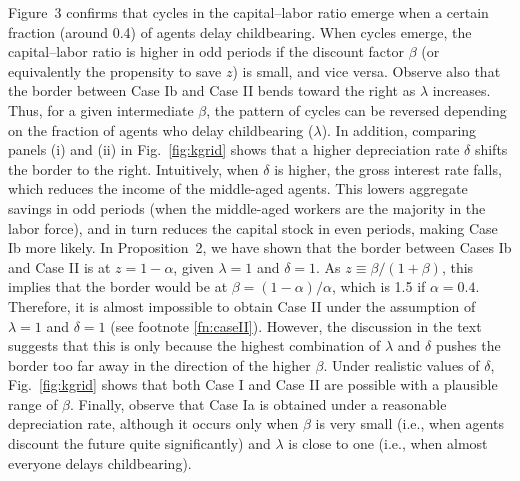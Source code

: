 \documentclass[nogrid]{MBE}%
\begin{document}
{Figure~3 confirms that cycles in the capital--labor ratio emerge when a certain fraction (around
0.4) of agents delay childbearing. When cycles emerge, the capital--labor ratio is higher in odd
periods if the discount factor $\beta$ (or equivalently the propensity to save $z$) is small, and
vice versa. Observe also that the border between Case Ib and Case II bends toward the right as
$\lambda$ increases. Thus, for a given intermediate $\beta$, the pattern of cycles can be reversed
depending on the fraction of agents who delay childbearing ($\lambda$). In addition, comparing
panels (i) and (ii) in Fig.\ \ref{fig:kgrid} shows that a higher depreciation rate $\delta$ shifts
the border to the right. Intuitively, when $\delta$ is higher, the gross interest rate falls,
which reduces the income of the middle-aged agents. This lowers aggregate savings in odd periods
(when the middle-aged workers are the majority in the labor force), and in turn reduces the
capital stock in even periods, making Case Ib more likely. {\label{fn:border} In Proposition~2, we
have shown that the border between Cases Ib and Case II is at $z=1-\alpha$, given $\lambda=1$ and
$\delta=1$. As $z\equiv \beta/(1+\beta)$, this implies that the border would be at $\beta
=(1-\alpha)/\alpha$, which is 1.5 if $\alpha=0.4$. Therefore, it is almost impossible to obtain
Case II under the assumption of $\lambda=1$ and $\delta=1$ (see footnote \ref{fn:caseII}).
However, the discussion in the text suggests that this is only because the highest combination of
$\lambda$ and $\delta$ pushes the border too far away in the direction of the higher $\beta $.
Under realistic values of $\delta$, Fig.\ \ref{fig:kgrid} shows that both Case I and Case II are
possible with a plausible range of $\beta$.} Finally, observe that Case Ia is obtained under a
reasonable depreciation rate, although it occurs only when $\beta$ is very small (i.e., when
agents discount the future quite significantly) and $\lambda$ is close to one (i.e., when almost
everyone delays childbearing).

}
\end{document}
